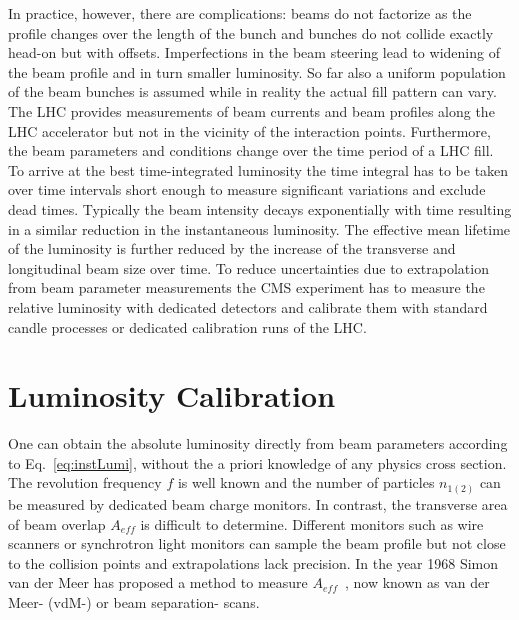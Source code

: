 In practice, however, there are complications: beams do not factorize as the profile changes over the length of the bunch and bunches do not collide exactly head-on but with offsets. Imperfections in the beam steering lead to widening of the beam profile and in turn smaller luminosity. So far also a uniform population of the beam bunches is assumed while in reality the actual fill pattern can vary. The LHC provides measurements of beam currents and beam profiles along the LHC accelerator but not in the vicinity of the interaction points. Furthermore, the beam parameters and conditions change over the time period of a LHC fill. To arrive at the best time-integrated luminosity the time integral has to be taken over time intervals short enough to measure significant variations and exclude dead times. Typically the beam intensity decays exponentially with time resulting in a similar reduction in the instantaneous luminosity. The effective mean lifetime of the luminosity is further reduced by the increase of the transverse and longitudinal beam size over time. To reduce uncertainties due to extrapolation from beam parameter measurements the CMS experiment has to measure the relative luminosity with dedicated detectors and calibrate them with standard candle processes or dedicated calibration runs of the LHC.




\section {Luminosity Calibration} \label{sec:lumiCalibration}
One can obtain the absolute luminosity directly from beam parameters according to Eq.~\ref{eq:instLumi},
without the a priori knowledge of any physics cross section.
The revolution frequency $f$ is well known and the number of particles
$n_{1(2)}$ can be measured by dedicated beam charge monitors.
In contrast, the transverse area of beam overlap $A_{eff}$ is difficult to determine.
Different monitors such as wire scanners or synchrotron light monitors can sample the beam
profile but not close to the collision points and extrapolations lack precision.
In the year 1968 Simon van der Meer has proposed a method to measure $A_{eff}$~\cite{vanderMeer:296752},
now  known as van der Meer- (vdM-) or beam separation- scans.

